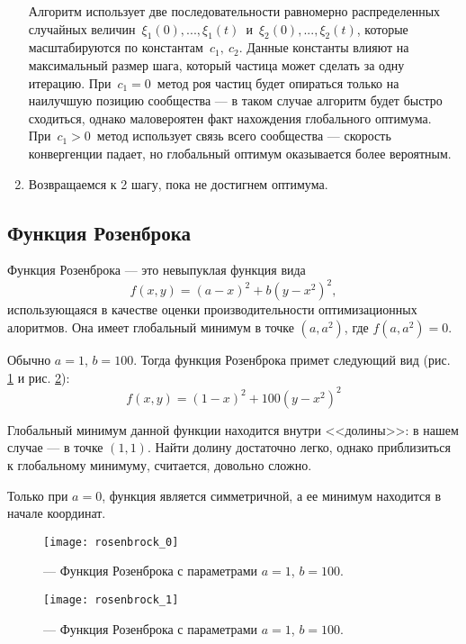 \begin{enumerate}
	Алгоритм использует две последовательности равномерно распределенных случайных величин~$\xi_1(0), ..., \xi_1(t)$~и~$\xi_2(0), ..., \xi_2(t)$, которые масштабируются по константам~$c_1,\ c_2$. Данные константы влияют на максимальный размер шага, который частица может сделать за одну итерацию.	При~$c_1 = 0$~метод роя частиц будет опираться только на наилучшую позицию сообщества --- в таком случае алгоритм будет быстро сходиться, однако маловероятен факт нахождения глобального оптимума. При~$c_1 > 0$~метод использует связь всего сообщества --- скорость конвергенции падает, но глобальный оптимум оказывается более вероятным.

	\item Возвращаемся к 2 шагу, пока не достигнем оптимума.
\end{enumerate}

\subsection{Функция Розенброка}

\noindent
Функция Розенброка --- это невыпуклая функция вида
\[
	f(x, y) = (a - x)^2 + b(y-x^2)^2,
\]
использующаяся в качестве оценки производительности оптимизационных алоритмов. Она имеет глобальный минимум в точке $(a, a^2)$, где $f(a, a^2) = 0$.

Обычно $a = 1$, $b=100$. Тогда функция Розенброка примет следующий вид (рис. \ref{img:rosenbrock_0} и рис. \ref{img:rosenbrock_1}):
\[
	f(x, y) = (1 - x)^2 + 100(y-x^2)^2
\]

Глобальный минимум данной функции находится внутри <<долины>>: в нашем случае --- в точке $(1, 1)$. Найти долину достаточно легко, однако приблизиться к глобальному минимуму, считается, довольно сложно.

Только при $a = 0$, функция является симметричной, а ее минимум находится в начале координат.

\begin{figure}[ht]
	\centering
  \texttt{[image: rosenbrock\_0]}
  \caption{ --- Функция Розенброка с параметрами $a = 1$, $b = 100$.}
  \label{img:rosenbrock_0}
\end{figure}

\newpage

\begin{figure}[ht]
	\centering
  \texttt{[image: rosenbrock\_1]}
  \caption{ --- Функция Розенброка с параметрами $a = 1$, $b = 100$.}
  \label{img:rosenbrock_1}
\end{figure}


